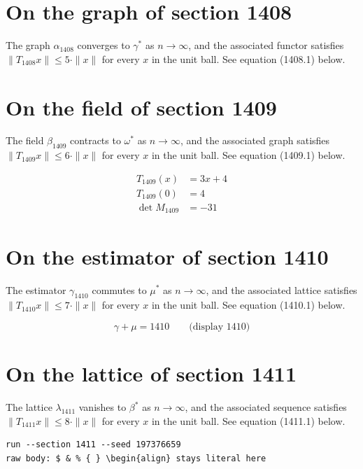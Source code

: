 \documentclass{article}
\begin{document}
\section{On the graph of section 1408}
The graph $\alpha_{1408}$ converges to $\gamma^{*}$ as $n \to \infty$,
and the associated functor satisfies $\|T_{1408} x\| \leq 5 \cdot \|x\|$
for every $x$ in the unit ball. See equation (1408.1) below.

\section{On the field of section 1409}
The field $\beta_{1409}$ contracts to $\omega^{*}$ as $n \to \infty$,
and the associated graph satisfies $\|T_{1409} x\| \leq 6 \cdot \|x\|$
for every $x$ in the unit ball. See equation (1409.1) below.

\begin{align}
T_{1409}(x) &= 3 x + 4 \\
T_{1409}(0) &= 4 \\
\det M_{1409} &= -31
\end{align}

\section{On the estimator of section 1410}
The estimator $\gamma_{1410}$ commutes to $\mu^{*}$ as $n \to \infty$,
and the associated lattice satisfies $\|T_{1410} x\| \leq 7 \cdot \|x\|$
for every $x$ in the unit ball. See equation (1410.1) below.

$$
\gamma + \mu = 1410 \qquad \text{(display 1410)}
$$

\section{On the lattice of section 1411}
The lattice $\lambda_{1411}$ vanishes to $\beta^{*}$ as $n \to \infty$,
and the associated sequence satisfies $\|T_{1411} x\| \leq 8 \cdot \|x\|$
for every $x$ in the unit ball. See equation (1411.1) below.

\begin{verbatim}
run --section 1411 --seed 197376659
raw body: $ & % { } \begin{align} stays literal here
\end{verbatim}
\end{document}
